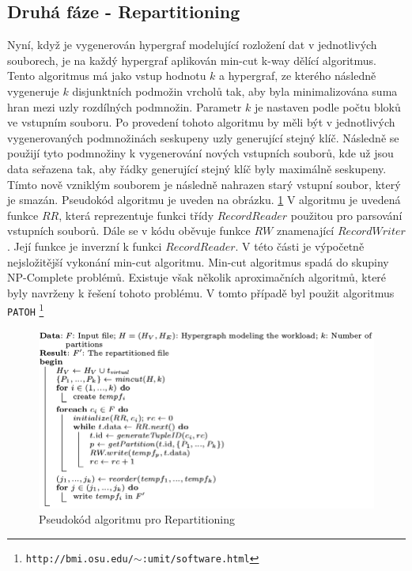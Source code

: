 \documentclass[thesis=M,czech]{FITthesis}[2012/06/26]
\begin{document}
\subsection{Druhá fáze - Repartitioning}
Nyní, když je vygenerován hypergraf modelující rozložení dat v jednotlivých souborech, je na každý hypergraf aplikován min-cut k-way dělící algoritmus. Tento algoritmus má jako vstup hodnotu $k$ a hypergraf, ze kterého následně vygeneruje $k$ disjunktních podmožin vrcholů tak, aby byla minimalizována suma hran mezi uzly rozdílných podmnožin. Parametr $k$ je nastaven podle počtu bloků ve vstupním souboru. Po provedení tohoto algoritmu by měli být v jednotlivých vygenerovaných podmnožinách seskupeny uzly generující stejný klíč. Následně se použijí tyto podmnožiny k vygenerování nových vstupních souborů, kde už jsou data seřazena tak, aby řádky generující stejný klíč byly maximálně seskupeny. Tímto nově vzniklým souborem je následně nahrazen starý vstupní soubor, který je smazán. Pseudokód algoritmu je uveden na obrázku. \ref{fig:alg2} V algoritmu je uvedená funkce $RR$, která reprezentuje funkci třídy $RecordReader$  použitou pro parsování vstupních souborů. Dále se v kódu oběvuje funkce $RW$ znamenající $RecordWriter$. Její funkce je inverzní k funkci $RecordReader$. V této části je výpočetně nejsložitější vykonání min-cut algoritmu. Min-cut algoritmus spadá do skupiny NP-Complete problémů. Existuje však několik aproximačních algoritmů, které byly navrženy k řešení tohoto problému. V tomto případě byl použit algoritmus \texttt{PATOH} \footnote{\texttt{http://bmi.osu.edu/$\sim$:umit/software.html}}

\begin{figure}\centering
	\includegraphics[width=1\textwidth, angle=0]{files/alg2}
	\caption[Pseudokód algoritmu pro Repartitioning]
	{Pseudokód algoritmu pro Repartitioning}\label{fig:alg2}
\end{figure} 
\end{document}
